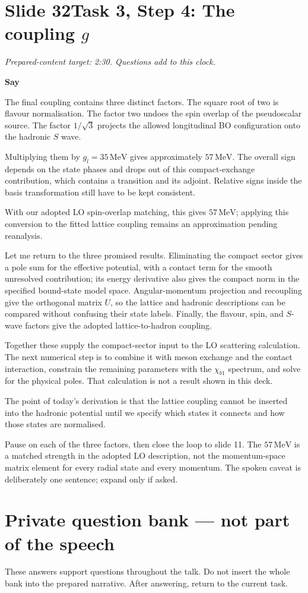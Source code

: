 \documentclass[11pt,a4paper]{article}
\newcommand{\MeV}{\,\mathrm{MeV}}
\newcommand{\cue}[1]{\begin{private}#1\end{private}}
\newenvironment{speech}{\par\textbf{Say}\par}{\par}
\newcommand{\slidenote}[3]{%
  \clearpage
  \pdfbookmark[1]{Slide #1}{slide-#1}%
  \section*{Slide #1\quad #2}
  \textit{Prepared-content target: #3. Questions add to this clock.}\par
}
\begin{document}
\slidenote{32}{Task 3, Step 4: The coupling $g$}{2:30}
\begin{speech}
The final coupling contains three distinct factors. The square
root of two is flavour normalisation. The factor two undoes
the spin overlap of the pseudoscalar source. The factor
$1/\sqrt3$ projects the allowed longitudinal BO configuration
onto the hadronic $S$ wave.

Multiplying them by $g_l=35\MeV$ gives approximately
$57\MeV$. The overall sign depends on the state phases and
drops out of this compact-exchange contribution, which contains
a transition and its adjoint. Relative signs inside the basis
transformation still have to be kept consistent.

With our adopted LO spin-overlap matching, this gives
$57\MeV$; applying this conversion to the fitted lattice
coupling remains an approximation pending reanalysis.

Let me return to the three promised results. Eliminating the
compact sector gives a pole sum for the effective potential,
with a contact term for the smooth unresolved contribution;
its energy derivative also gives the compact norm in the
specified bound-state model space. Angular-momentum projection
and recoupling give the orthogonal matrix $U$, so the lattice
and hadronic descriptions can be compared without confusing
their state labels. Finally, the flavour, spin, and $S$-wave
factors give the adopted lattice-to-hadron coupling.

Together these supply the compact-sector input to the LO
scattering calculation. The next numerical step is to combine
it with meson exchange and the contact interaction, constrain
the remaining parameters with the $\chi_{b1}$ spectrum, and
solve for the physical poles. That calculation is not a result
shown in this deck.

The point of today's derivation is that the lattice coupling
cannot be inserted into the hadronic potential until we specify
which states it connects and how those states are normalised.
\end{speech}
\cue{Pause on each of the three factors, then close the loop to slide 11.
The $57\MeV$ is a matched strength in the adopted LO description, not the
momentum-space matrix element for every radial state and every momentum.
The spoken caveat is deliberately one sentence; expand only if asked.}

\clearpage
{}
\section*{Private question bank --- not part of the speech}
These answers support questions throughout the talk. Do not insert the whole
bank into the prepared narrative. After answering, return to the current task.
\end{document}
